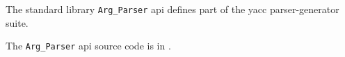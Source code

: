 
The standard library {\tt Arg\_Parser} api defines part of the yacc parser-generator suite.

The {\tt Arg\_Parser} api source code is in .
